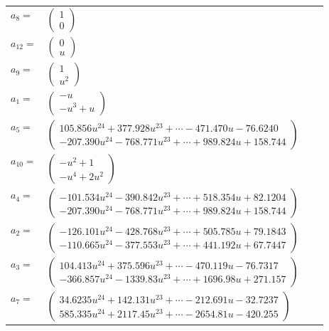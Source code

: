 \documentclass[1p]{elsarticle_modified}
\theoremstyle{definition}
\begin{document}
\begin{tabular}{m{7pt} m{180pt} m{7pt} m{180pt} }
\flushright $a_{8}=$&$\begin{pmatrix}1\\0\end{pmatrix}$ \\
\flushright $a_{12}=$&$\begin{pmatrix}0\\u\end{pmatrix}$ \\
\flushright $a_{9}=$&$\begin{pmatrix}1\\u^2\end{pmatrix}$ \\
\flushright $a_{1}=$&$\begin{pmatrix}- u\\- u^3+u\end{pmatrix}$ \\
\flushright $a_{5}=$&$\begin{pmatrix}105.856 u^{24}+377.928 u^{23}+\cdots-471.470 u-76.6240\\-207.390 u^{24}-768.771 u^{23}+\cdots+989.824 u+158.744\end{pmatrix}$ \\
\flushright $a_{10}=$&$\begin{pmatrix}- u^2+1\\- u^4+2 u^2\end{pmatrix}$ \\
\flushright $a_{4}=$&$\begin{pmatrix}-101.534 u^{24}-390.842 u^{23}+\cdots+518.354 u+82.1204\\-207.390 u^{24}-768.771 u^{23}+\cdots+989.824 u+158.744\end{pmatrix}$ \\
\flushright $a_{2}=$&$\begin{pmatrix}-126.101 u^{24}-428.768 u^{23}+\cdots+505.785 u+79.1843\\-110.665 u^{24}-377.553 u^{23}+\cdots+441.192 u+67.7447\end{pmatrix}$ \\
\flushright $a_{3}=$&$\begin{pmatrix}104.413 u^{24}+375.596 u^{23}+\cdots-470.119 u-76.7317\\-366.857 u^{24}-1339.83 u^{23}+\cdots+1696.98 u+271.157\end{pmatrix}$ \\
\flushright $a_{7}=$&$\begin{pmatrix}34.6235 u^{24}+142.131 u^{23}+\cdots-212.691 u-32.7237\\585.335 u^{24}+2117.45 u^{23}+\cdots-2654.81 u-420.255\end{pmatrix}$ \\

\end{tabular}
\end{document}
